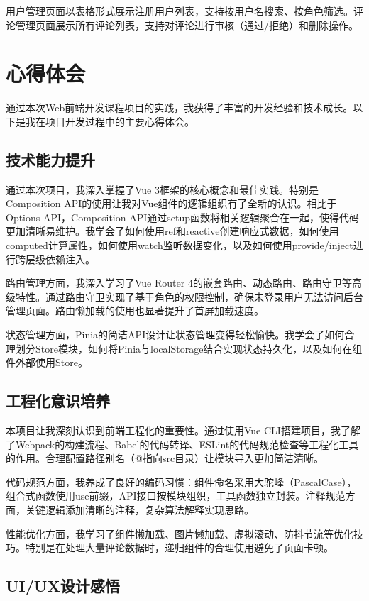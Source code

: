 \documentclass[12pt,a4paper]{article}
\begin{document}
用户管理页面以表格形式展示注册用户列表，支持按用户名搜索、按角色筛选。评论管理页面展示所有评论列表，支持对评论进行审核（通过/拒绝）和删除操作。

\section{心得体会}

通过本次Web前端开发课程项目的实践，我获得了丰富的开发经验和技术成长。以下是我在项目开发过程中的主要心得体会。

\subsection{技术能力提升}

通过本次项目，我深入掌握了Vue 3框架的核心概念和最佳实践。特别是Composition API的使用让我对Vue组件的逻辑组织有了全新的认识。相比于Options API，Composition API通过setup函数将相关逻辑聚合在一起，使得代码更加清晰易维护。我学会了如何使用ref和reactive创建响应式数据，如何使用computed计算属性，如何使用watch监听数据变化，以及如何使用provide/inject进行跨层级依赖注入。

路由管理方面，我深入学习了Vue Router 4的嵌套路由、动态路由、路由守卫等高级特性。通过路由守卫实现了基于角色的权限控制，确保未登录用户无法访问后台管理页面。路由懒加载的使用也显著提升了首屏加载速度。

状态管理方面，Pinia的简洁API设计让状态管理变得轻松愉快。我学会了如何合理划分Store模块，如何将Pinia与localStorage结合实现状态持久化，以及如何在组件外部使用Store。

\subsection{工程化意识培养}

本项目让我深刻认识到前端工程化的重要性。通过使用Vue CLI搭建项目，我了解了Webpack的构建流程、Babel的代码转译、ESLint的代码规范检查等工程化工具的作用。合理配置路径别名（@指向src目录）让模块导入更加简洁清晰。

代码规范方面，我养成了良好的编码习惯：组件命名采用大驼峰（PascalCase），组合式函数使用use前缀，API接口按模块组织，工具函数独立封装。注释规范方面，关键逻辑添加清晰的注释，复杂算法解释实现思路。

性能优化方面，我学习了组件懒加载、图片懒加载、虚拟滚动、防抖节流等优化技巧。特别是在处理大量评论数据时，递归组件的合理使用避免了页面卡顿。

\subsection{UI/UX设计感悟}
\end{document}
